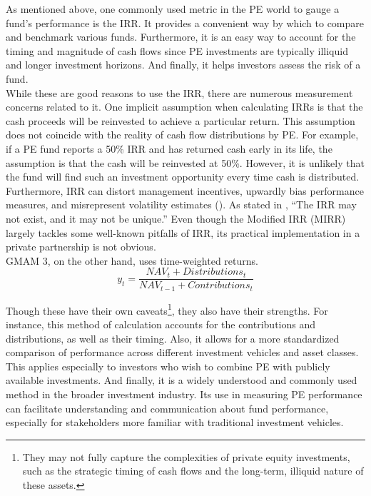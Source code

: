 \documentclass[11pt]{article}
\begin{document}
As mentioned above, one commonly used metric in the PE world to gauge a fund’s performance is the IRR. It provides a convenient way by which to compare and benchmark various funds. Furthermore, it is an easy way to account for the timing and magnitude of cash flows since PE investments are typically illiquid and longer investment horizons. And finally, it helps investors assess the risk of a fund. \\

While these are good reasons to use the IRR, there are numerous measurement concerns related to it. One implicit assumption when calculating IRRs is that the cash proceeds will be reinvested to achieve a particular return. This assumption does not coincide with the reality of cash flow distributions by PE. For example, if a PE fund reports a 50\% IRR and has returned cash early in its life, the assumption is that the cash will be reinvested at 50\%. However, it is unlikely that the fund will find such an investment opportunity every time cash is distributed. \\

Furthermore, IRR can distort management incentives, upwardly bias performance measures, and misrepresent volatility estimates (\cite{Phalippou2008}). As stated in \cite{Sorensen2013}, ``The IRR may not exist, and it may not be unique.'' Even though the Modified IRR (MIRR) largely tackles some well-known pitfalls of IRR, its practical implementation in a private partnership is not obvious. \\

GMAM 3, on the other hand, uses time-weighted returns. 
\begin{equation}
	y_t = \frac{NAV_t + Distributions_t}{NAV_{t-1} + Contributions_t}
\end{equation}

Though these have their own caveats\footnote{They may not fully capture the complexities of private equity investments, such as the strategic timing of cash flows and the long-term, illiquid nature of these assets.}, they also have their strengths. For instance, this method of calculation accounts for the contributions and distributions, as well as their timing. Also, it allows for a more standardized comparison of performance across different investment vehicles and asset classes. This applies especially to investors who wish to combine PE with publicly available investments. And finally, it is a widely understood and commonly used method in the broader investment industry. Its use in measuring PE performance can facilitate understanding and communication about fund performance, especially for stakeholders more familiar with traditional investment vehicles. \\
\end{document}
